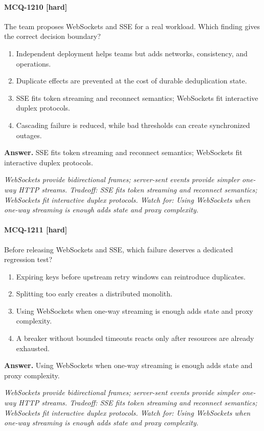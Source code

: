 \paragraph{MCQ-1210 [hard]} The team proposes WebSockets and SSE for a real workload. Which finding gives the correct decision boundary?
\begin{enumerate}[label=\Alph*.]
\item Independent deployment helps teams but adds networks, consistency, and operations.
\item Duplicate effects are prevented at the cost of durable deduplication state.
\item SSE fits token streaming and reconnect semantics; WebSockets fit interactive duplex protocols.
\item Cascading failure is reduced, while bad thresholds can create synchronized outages.
\end{enumerate}
\noindent\textbf{Answer.} SSE fits token streaming and reconnect semantics; WebSockets fit interactive duplex protocols.
\par\textit{WebSockets provide bidirectional frames; server-sent events provide simpler one-way HTTP streams. Tradeoff: SSE fits token streaming and reconnect semantics; WebSockets fit interactive duplex protocols. Watch for: Using WebSockets when one-way streaming is enough adds state and proxy complexity.}
\paragraph{MCQ-1211 [hard]} Before releasing WebSockets and SSE, which failure deserves a dedicated regression test?
\begin{enumerate}[label=\Alph*.]
\item Expiring keys before upstream retry windows can reintroduce duplicates.
\item Splitting too early creates a distributed monolith.
\item Using WebSockets when one-way streaming is enough adds state and proxy complexity.
\item A breaker without bounded timeouts reacts only after resources are already exhausted.
\end{enumerate}
\noindent\textbf{Answer.} Using WebSockets when one-way streaming is enough adds state and proxy complexity.
\par\textit{WebSockets provide bidirectional frames; server-sent events provide simpler one-way HTTP streams. Tradeoff: SSE fits token streaming and reconnect semantics; WebSockets fit interactive duplex protocols. Watch for: Using WebSockets when one-way streaming is enough adds state and proxy complexity.}
